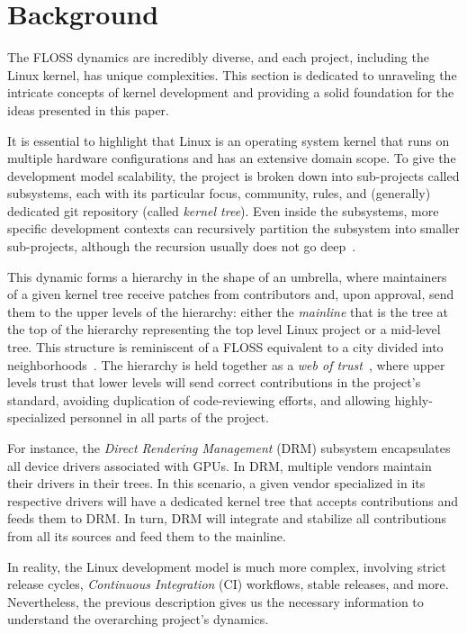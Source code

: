\section{Background}

The FLOSS dynamics are incredibly diverse, and each project, including the Linux
kernel, has unique complexities. This section is dedicated to unraveling the
intricate concepts of kernel development and providing a solid foundation for
the ideas presented in this paper.

It is essential to highlight that Linux is an operating system kernel that runs
on multiple hardware configurations and has an extensive domain scope. To give
the development model scalability, the project is broken down into sub-projects
called subsystems, each with its particular focus, community, rules, and
(generally) dedicated git repository (called \textit{kernel tree}). Even inside
the subsystems, more specific development contexts can recursively partition the
subsystem into smaller sub-projects, although the recursion usually does not go
deep~\cite{corbet2017-patchflow}.

This dynamic forms a hierarchy in the shape of an umbrella, where maintainers of
a given kernel tree receive patches from contributors and, upon approval, send
them to the upper levels of the hierarchy: either the \textit{mainline} that is
the tree at the top of the hierarchy representing the top level Linux project or
a mid-level tree. This structure is reminiscent of a FLOSS equivalent to a city
divided into neighborhoods~\cite{wen2021-masterthesis}. The hierarchy is held
together as a \textit{web of trust}~\cite{corbet2014-4.4}, where upper levels
trust that lower levels will send correct contributions in the project's
standard, avoiding duplication of code-reviewing efforts, and allowing
highly-specialized personnel in all parts of the project. 

For instance, the \textit{Direct Rendering Management} (DRM) subsystem
encapsulates all device drivers associated with GPUs. In DRM, multiple vendors
maintain their drivers in their trees. In this scenario, a given vendor
specialized in its respective drivers will have a dedicated kernel tree that
accepts contributions and feeds them to DRM. In turn, DRM will integrate and
stabilize all contributions from all its sources and feed them to the mainline. 

In reality, the Linux development model is much more complex, involving strict
release cycles, \textit{Continuous Integration} (CI) workflows, stable releases,
and more. Nevertheless, the previous description gives us the necessary
information to understand the overarching project's dynamics.


